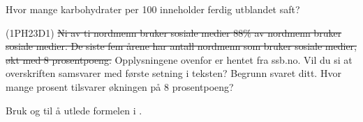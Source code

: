 Hvor mange karbohydrater per 100 inneholder ferdig utblandet saft? \os

\newpage
{} (1PH23D1)
\st{
Ni av ti nordmenn bruker sosiale medier
88\% av nordmenn bruker sosiale medier.
De siste fem årene har antall nordmenn som bruker sosiale
medier, økt med 8 prosentpoeng.
}
Opplysningene ovenfor er hentet fra ssb.no.\os
Vil du si at overskriften samsvarer med første setning i teksten?
Begrunn svaret ditt.\os
Hvor mange prosent tilsvarer økningen på 8 prosentpoeng?

Bruk  og  til å utlede formelen i . 



